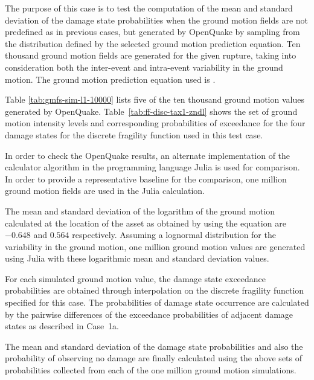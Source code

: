 The purpose of this case is to test the computation of the mean and standard deviation of the damage state probabilities when the ground motion fields are not predefined as in previous cases, but generated by OpenQuake by sampling from the distribution defined by the selected ground motion prediction equation. Ten thousand ground motion fields are generated for the given rupture, taking into consideration both the inter-event and intra-event variability in the ground motion. The ground motion prediction equation used is \citet{boore2008}.

Table \ref{tab:gmfs-sim-l1-10000} lists five of the ten thousand ground motion values generated by OpenQuake. Table~\ref{tab:ff-disc-tax1-zndl} shows the set of ground motion intensity levels and corresponding probabilities of exceedance for the four damage states for the discrete fragility function used in this test case.

In order to check the OpenQuake results, an alternate implementation of the calculator algorithm in the programming language Julia is used for comparison. In order to provide a representative baseline for the comparison, one million ground motion fields are used in the Julia calculation.

The mean and standard deviation of the logarithm of the ground motion calculated at the location of the asset as obtained by using the \citet{boore2008} equation are $-0.648$ and $0.564$ respectively. Assuming a lognormal distribution for the variability in the ground motion, one million ground motion values are generated using Julia with these logarithmic mean and standard deviation values.

For each simulated ground motion value, the damage state exceedance probabilities are obtained through interpolation on the discrete fragility function specified for this case. The probabilities of damage state occurrence are calculated by the pairwise differences of the exceedance probabilities of adjacent damage states as described in Case~1a.

The mean and standard deviation of the damage state probabilities and also the probability of observing no damage are finally calculated using the above sets of probabilities collected from each of the one million ground motion simulations.